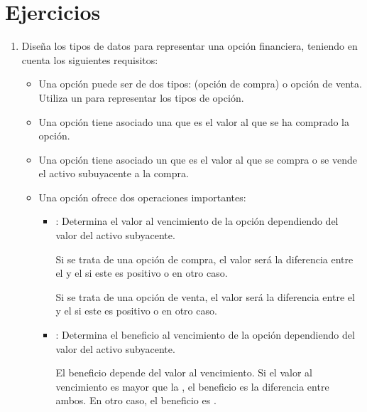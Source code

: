 \section{Ejercicios}

\begin{enumerate}

\item
Diseña los tipos de datos para representar una opción financiera, teniendo en cuenta los siguientes requisitos:

\begin{itemize}

\item Una opción puede ser de dos tipos:  (opción de compra) o
       opción de venta. Utiliza un  para
      representar los tipos de opción.

\item Una opción tiene asociado una  que es el valor al que se
      ha comprado la opción.

\item Una opción tiene asociado un  que es el valor al que se
      compra o se vende el activo subuyacente a la compra.

\item Una opción ofrece dos operaciones importantes:

  \begin{itemize}

    \item {}: Determina el valor al
          vencimiento de la opción dependiendo del valor del activo subyacente.

          Si se trata de una opción de compra, el valor será la diferencia entre
          el  y el  si este es positivo o
           en otro caso.

          Si se trata de una opción de venta, el valor será la diferencia entre
          el  y el  si este es positivo o
           en otro caso. 

    \item {}: Determina el
          beneficio al vencimiento de la opción dependiendo del valor del activo
          subyacente.

          El beneficio depende del valor al vencimiento. Si el valor al vencimiento
          es mayor que la , el beneficio es la diferencia entre ambos.
          En otro caso, el beneficio es .


\end{itemize}
\end{itemize}
\end{enumerate}
